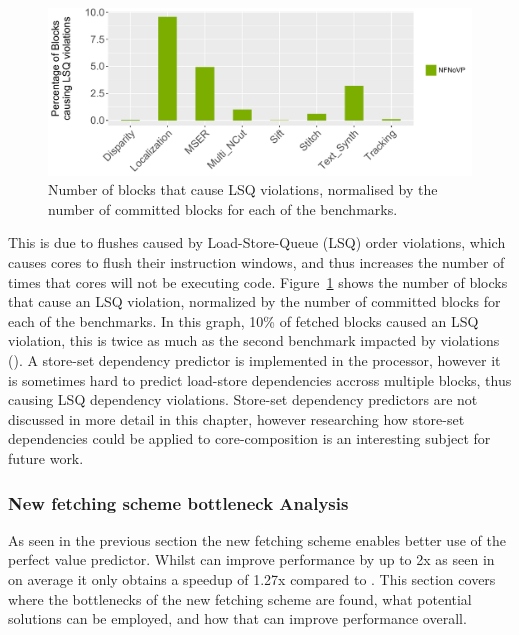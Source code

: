 \begin{figure}[t]
    \centering
    \includegraphics[width=1\textwidth]{chapter3/graphics/lsqViol2.pdf}
    \caption{Number of blocks that cause LSQ violations, normalised by the number of committed blocks for each of the benchmarks.}
    \label{fig:lsqvio}
	\vspace{1em}
\end{figure}

This is due to flushes caused by Load-Store-Queue (LSQ) order violations, which causes cores to flush their instruction windows, and thus increases the number of times that cores will not be executing code.
Figure~\ref{fig:lsqvio} shows the number of blocks that cause an LSQ violation, normalized by the number of committed blocks for each of the benchmarks.
In this graph, 10\% of fetched blocks caused an LSQ violation, this is twice as much as the second benchmark impacted by violations ().
A store-set dependency predictor is implemented in the processor, however it is sometimes hard to predict load-store dependencies accross multiple blocks, thus causing LSQ dependency violations.
Store-set dependency predictors are not discussed in more detail in this chapter, however researching how store-set dependencies could be applied to core-composition is an interesting subject for future work.

\subsubsection{New fetching scheme bottleneck Analysis}

As seen in the previous section the new fetching scheme enables better use of the perfect value predictor. 
Whilst \nfnovp{} can improve performance by up to 2x as seen in  on average it only obtains a speedup of 1.27x compared to \novp{}.
This section covers where the bottlenecks of the new fetching scheme are found, what potential solutions can be employed, and how that can improve performance overall.

